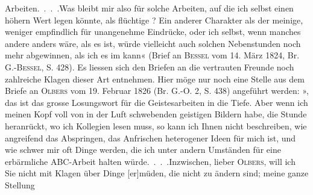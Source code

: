 Arbeiten.\ .\ .\ .\quad Was bleibt mir also für solche Arbeiten, auf die ich
selbst einen höhern Wert legen könnte, als flüchtige ? Ein
anderer Charakter als der meinige, weniger empfindlich für unangenehme Eindrücke,
oder ich selbst, wenn manches andere anders wäre, als es ist, würde
vielleicht auch solchen Nebenstunden noch mehr abgewinnen, als ich es im
 kann« (Brief an \textsc{Bessel} vom 14. März 1824, Br. G.-\textsc{Bessel},
S. 428). Es liessen sich den Briefen an die vertrauten Freunde noch zahlreiche
Klagen dieser Art entnehmen. Hier möge nur noch eine Stelle aus
dem Briefe an \textsc{Olbers} vom 19. Februar 1826 (Br. G.-O. 2, S. 438) angeführt
werden: », das ist das grosse Losungswort für die Geistesarbeiten
in die Tiefe. Aber wenn ich meinen Kopf voll von in der Luft
schwebenden geistigen Bildern habe, die Stunde heranrückt, wo ich Kollegien
lesen muss, so kann ich Ihnen nicht beschreiben, wie angreifend das Abspringen,
das Anfrischen heterogener Ideen für mich ist, und wie schwer mir
oft Dinge werden, die ich unter andern Umständen für eine erbärmliche ABC-Arbeit
halten würde.\ .\ .\ .\quad Inzwischen, lieber \textsc{Olbers}, will ich Sie nicht mit
Klagen über Dinge [er]müden, die nicht zu ändern sind; meine ganze Stellung
\clearpage\endgroup
